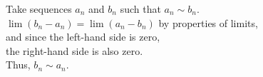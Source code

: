 \documentclass[preview]{standalone}
\begin{document}
\begin{center}
Take sequences $a_n$ and $b_n$ such that $a_n \sim b_n$.\\$\lim (b_n - a_n) = \lim (a_n - b_n)$ by properties of limits,\\and since the left-hand side is zero,\\ the right-hand side is also zero.\\Thus, $b_n \sim a_n$.
\end{center}
\end{document}
